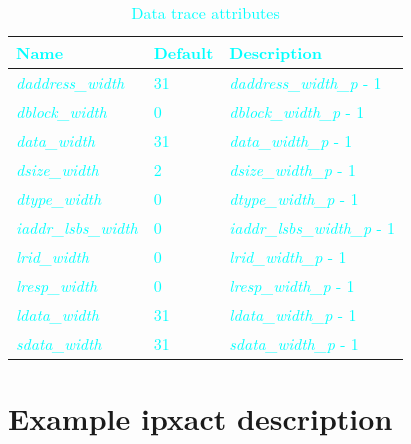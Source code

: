 \begin{table}[!h]
    \centering
    \caption{\textcolor{cyan}{Data trace attributes}}
    \label{tab:dataAttributes}
    \begin{tabulary}{\textwidth}{|l|l|p{80mm}|}
        \hline
        \textbf{\textcolor{cyan}{Name}} & \textbf{\textcolor{cyan}{Default}} & \textbf{\textcolor{cyan}{Description}} \\
        \hline
        \textit{\textcolor{cyan}{daddress\_width}} & \textcolor{cyan}{31} & \textcolor{cyan}{\textit{daddress\_width\_p} - 1}\\
        \hline
        \textit{\textcolor{cyan}{dblock\_width}} & \textcolor{cyan}{0} & \textcolor{cyan}{\textit{dblock\_width\_p} - 1}\\
        \hline
        \textit{\textcolor{cyan}{data\_width}} & \textcolor{cyan}{31} & \textcolor{cyan}{\textit{data\_width\_p} - 1}\\
        \hline
        \textit{\textcolor{cyan}{dsize\_width}} & \textcolor{cyan}{2} & \textcolor{cyan}{\textit{dsize\_width\_p} - 1}\\
        \hline
        \textit{\textcolor{cyan}{dtype\_width}} & \textcolor{cyan}{0} & \textcolor{cyan}{\textit{dtype\_width\_p} - 1}\\
        \hline
        \textit{\textcolor{cyan}{iaddr\_lsbs\_width}} & \textcolor{cyan}{0} & \textcolor{cyan}{\textit{iaddr\_lsbs\_width\_p} - 1}\\
        \hline
        \textit{\textcolor{cyan}{lrid\_width}} & \textcolor{cyan}{0} & \textcolor{cyan}{\textit{lrid\_width\_p} - 1}\\
        \hline
        \textit{\textcolor{cyan}{lresp\_width}} & \textcolor{cyan}{0} & \textcolor{cyan}{\textit{lresp\_width\_p} - 1}\\
        \hline
        \textit{\textcolor{cyan}{ldata\_width}} & \textcolor{cyan}{31} & \textcolor{cyan}{\textit{ldata\_width\_p} - 1}\\
        \hline
        \textit{\textcolor{cyan}{sdata\_width}} & \textcolor{cyan}{31} & \textcolor{cyan}{\textit{sdata\_width\_p} - 1}\\
        \hline
    \end{tabulary}
\end{table}

\FloatBarrier
\section{Example ipxact description} \label{sec:ipxact}


